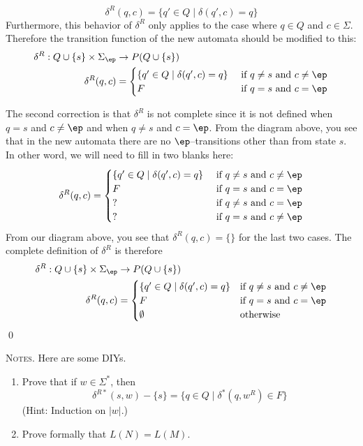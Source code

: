 \[
\delta^R(q, c) = \{ q' \in Q \mid \delta(q', c) = q \}
\]
Furthermore, this behavior of $\delta^R$ only applies to the case where $q \in Q$ and $c \in \Sigma$.
Therefore the transition function of the new automata should be modified to this:
\begin{align*}
  \delta^R: Q \cup\{s\} \times \Sigma_\ep &\rightarrow P(Q\cup \{s\}) \\
  \delta^R(q, c)
  &=
  \begin{cases}
    \{ q' \in Q \mid \delta(q', c) = q \} &  \text{ if $q \neq s$ and $c \neq \ep$} \\
    F      & \text{ if $q = s$ and $c = \ep$}
    \end{cases}
\end{align*}

The second correction is that $\delta^R$ is not complete since
it is not defined when $q = s$ and $c \neq \ep$ and when $q \neq s$ and $c = \ep$.
From the diagram above, you see that in the new automata there are no $\ep$--transitions other than
from state $s$.
In other word, we will need to fill in two blanks here:
\[
\delta^R(q, c)
=
\begin{cases}
  \{ q' \in Q \mid \delta(q', c) = q \} &  \text{ if $q \neq s$ and $c \neq \ep$} \\
  F      & \text{ if $q = s$ and $c = \ep$} \\
  ?      & \text{ if $q \neq s$ and $c = \ep$} \\
  ?      & \text{ if $q = s$ and $c \neq \ep$}
\end{cases}
\]
From our diagram above, you see that
$\delta^R(q, c) = \{\}$ for the last two cases.
The complete definition of $\delta^R$ is therefore
\begin{align*}
  \delta^R: Q \cup\{s\} \times \Sigma_\ep &\rightarrow P(Q\cup \{s\}) \\
  \delta^R(q, c)
  &=
  \begin{cases}
    \{ q' \in Q \mid \delta(q', c) = q \} & \text{if $q \neq s$ and $c \neq \ep$} \\ 
    F                                     & \text{if $q = s$ and $c = \ep$} \\
    \emptyset                             & \text{otherwise}
    \end{cases}
\end{align*}
\qed

\textsc{Notes}. Here are some DIYs.
\begin{enumerate}
\item Prove that if $w \in \Sigma^*$, then
  \[
  \delta^{R*}(s, w) - \{s\} = \{q \in Q \mid \delta^*(q, w^R) \in F\}
  \]
  (Hint: Induction on $|w|$.)
\item Prove formally that $L(N) = L(M)$.

\end{enumerate}
